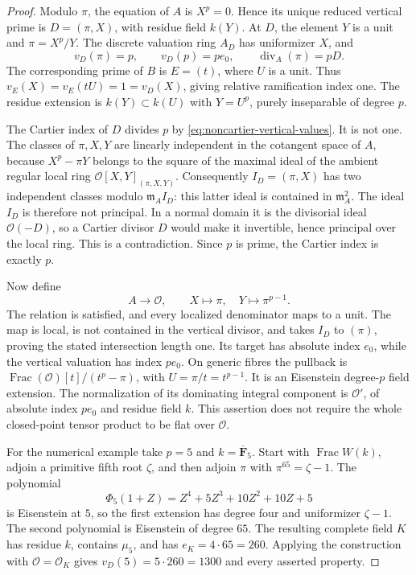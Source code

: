 \begin{proof}
Modulo $\pi$, the equation of $A$ is $X^p=0$. Hence its unique reduced
vertical prime is $D=(\pi,X)$, with residue field $k(Y)$.
At $D$, the element $Y$ is a unit and $\pi=X^p/Y$.
The discrete valuation ring $A_D$ has uniformizer $X$, and
\begin{equation}
       v_D(\pi)=p,\qquad v_D(p)=p e_0,
       \qquad\operatorname{div}_A(\pi)=pD.
\label{eq:noncartier-vertical-values}
\end{equation}
The corresponding prime of $B$ is $E=(t)$, where $U$ is a unit.
Thus $v_E(X)=v_E(tU)=1=v_D(X)$, giving relative ramification index one.
The residue extension is $k(Y)\subset k(U)$ with $Y=U^p$, purely
inseparable of degree $p$.

The Cartier index of $D$ divides $p$ by
\eqref{eq:noncartier-vertical-values}. It is not one.
The classes of $\pi,X,Y$ are linearly independent in the cotangent
space of $A$, because $X^p-\pi Y$ belongs to the square of the maximal
ideal of the ambient regular local ring
$\mathcal O[X,Y]_{(\pi,X,Y)}$.
Consequently $I_D=(\pi,X)$ has two independent classes modulo
$\mathfrak m_A I_D$: this latter ideal is contained in $\mathfrak m_A^2$.
The ideal $I_D$ is therefore not principal. In a normal domain it is
the divisorial ideal $\mathcal O(-D)$, so a Cartier divisor $D$ would
make it invertible, hence principal over the local ring. This is a
contradiction. Since $p$ is prime, the Cartier index is exactly $p$.

Now define
\begin{equation}
                  A\longrightarrow\mathcal O,
                  \qquad X\longmapsto\pi,\quad
                         Y\longmapsto\pi^{p-1}.
\label{eq:noncartier-specialization-map}
\end{equation}
The relation is satisfied, and every localized denominator maps to a
unit. The map is local, is not contained in the vertical divisor,
and takes $I_D$ to $(\pi)$, proving the stated intersection length one.
Its target has absolute index $e_0$, while the vertical valuation has
index $pe_0$.
On generic fibres the pullback is
$\operatorname{Frac}(\mathcal O)[t]/(t^p-\pi)$, with
$U=\pi/t=t^{p-1}$. It is an Eisenstein degree-$p$ field extension.
The normalization of its dominating integral component is
$\mathcal O'$, of absolute index $pe_0$ and residue field $k$.
This assertion does not require the whole closed-point tensor product
to be flat over $\mathcal O$.

For the numerical example take $p=5$ and $k=\overline{\mathbf F}_5$.
Start with $\operatorname{Frac}W(k)$, adjoin a primitive fifth root
$\zeta$, and then adjoin $\pi$ with $\pi^{65}=\zeta-1$.
The polynomial
\[
                   \Phi_5(1+Z)=Z^4+5Z^3+10Z^2+10Z+5
\]
is Eisenstein at $5$, so the first extension has degree four and
uniformizer $\zeta-1$. The second polynomial is Eisenstein of degree
$65$. The resulting complete field $K$ has residue $k$, contains
$\mu_5$, and has $e_K=4\cdot65=260$.
Applying the construction with $\mathcal O=\mathcal O_K$ gives
$v_D(5)=5\cdot260=1300$ and every asserted property.
\end{proof}

